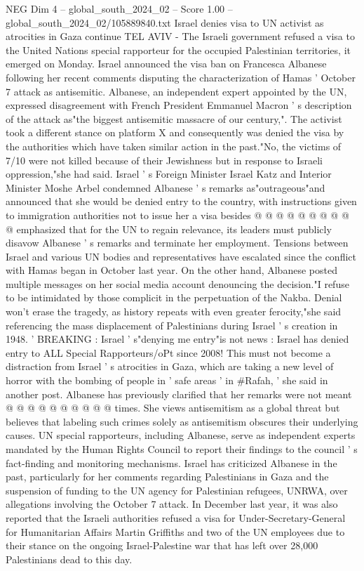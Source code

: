 \begin{textsample}{NEG Dim 4 – global\_south\_2024\_02 – Score 1.00 – global\_south\_2024\_02/105889840.txt}  \label{ex:f4_neg_386}
Israel denies visa to UN activist as atrocities in Gaza continue TEL AVIV - The Israeli government refused a visa to the United Nations special rapporteur for the occupied Palestinian territories, it emerged on Monday.
Israel announced the visa ban on Francesca Albanese following her recent comments disputing the characterization of Hamas ' October 7 attack as antisemitic.
Albanese, an independent expert appointed by the UN, expressed disagreement with French President Emmanuel Macron ' s description of the attack as"the biggest antisemitic massacre of our century,".
The activist took a different stance on platform X and consequently was denied the visa by the authorities which have taken similar action in the past."No, the victims of 7/10 were not killed because of their Jewishness but in response to Israeli oppression,"she had said.
Israel ' s Foreign Minister Israel Katz and Interior Minister Moshe Arbel condemned Albanese ' s remarks as"outrageous"and announced that she would be denied entry to the country, with instructions given to immigration authorities not to issue her a visa besides @ @ @ @ @ @ @ @ @ @ emphasized that for the UN to regain relevance, its leaders must publicly disavow Albanese ' s remarks and terminate her employment.
Tensions between Israel and various UN bodies and representatives have escalated since the conflict with Hamas began in October last year.
On the other hand, Albanese posted multiple messages on her social media account denouncing the decision."I refuse to be intimidated by those complicit in the perpetuation of the Nakba.
Denial won't erase the tragedy, as history repeats with even greater ferocity,"she said referencing the mass displacement of Palestinians during Israel ' s creation in 1948. ' BREAKING : Israel ' s"denying me entry"is not news : Israel has denied entry to ALL Special Rapporteurs/oPt since 2008!
This must not become a distraction from Israel ' s atrocities in Gaza, which are taking a new level of horror with the bombing of people in ' safe areas ' in \#Rafah, ' she said in another post.
Albanese has previously clarified that her remarks were not meant @ @ @ @ @ @ @ @ @ @ times.
She views antisemitism as a global threat but believes that labeling such crimes solely as antisemitism obscures their underlying causes.
UN special rapporteurs, including Albanese, serve as independent experts mandated by the Human Rights Council to report their findings to the council ' s fact-finding and monitoring mechanisms.
Israel has criticized Albanese in the past, particularly for her comments regarding Palestinians in Gaza and the suspension of funding to the UN agency for Palestinian refugees, UNRWA, over allegations involving the October 7 attack.
In December last year, it was also reported that the Israeli authorities refused a visa for Under-Secretary-General for Humanitarian Affairs Martin Griffiths and two of the UN employees due to their stance on the ongoing Israel-Palestine war that has left over 28,000 Palestinians dead to this day.

\end{textsample}
